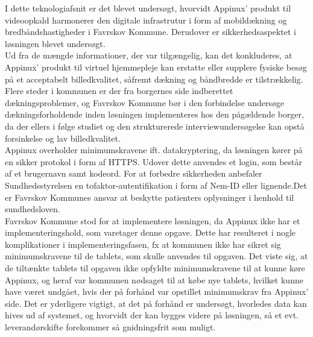 I dette teknologiafsnit er det blevet undersøgt, hvorvidt Appinux’ produkt til videoopkald harmonerer den digitale infrastrutur i form af mobildækning og bredbåndshastigheder i Favrskov Kommune. Derudover er sikkerhedsaspektet i løsningen blevet undersøgt.\\
Ud fra de mængde informationer, der var tilgængelig, kan det konkluderes, at Appinux’ produkt til virtuel hjemmepleje kan erstatte eller supplere fysiske besøg på et acceptabelt billedkvalitet, såfremt dækning og båndbredde er tilstrækkelig.
\\Flere steder i kommunen er der fra borgernes side indberettet dækningsproblemer, og Favrskov Kommune bør i den forbindelse undersøge dækningsforholdende inden løsningen implementeres hos den pågældende borger, da der ellers i følge studiet  og den strukturerede interviewundersøgelse kan opstå forsinkelse og lav billedkvalitet.\\
Appinux overholder minimumskravene ift. datakryptering, da løsningen kører på en sikker protokol i form af HTTPS. Udover dette anvendes et login, som består af et brugernavn samt kodeord. For at forbedre sikkerheden anbefaler Sundhedsstyrelsen en tofaktor-autentifikation i form af Nem-ID eller lignende.Det er Favrskov Kommunes ansvar at beskytte patienters oplysninger i henhold til sundhedsloven.\\ 
Favrskov Kommune stod for at implementere løsningen, da Appinux ikke har et implementeringshold, som varetager denne opgave. Dette har resulteret i nogle komplikationer i implementeringsfasen, fx at kommunen ikke har sikret sig minimumskravene til de tablets, som skulle anvendes til opgaven. Det viste sig, at de tiltænkte tablets til opgaven ikke opfyldte minimumskravene til at kunne køre Appinux, og heraf var kommunen nødsaget til at købe nye tablets, hvilket kunne have været undgået, hvis der på forhånd var opstillet minimumskrav fra Appinux' side. Det er yderligere vigtigt, at det på forhånd er undersøgt, hvorledes data kan hives ud af systemet, og hvorvidt der kan bygges videre på løsningen, så et evt. leverandørskifte forekommer så gnidningsfrit som muligt.
